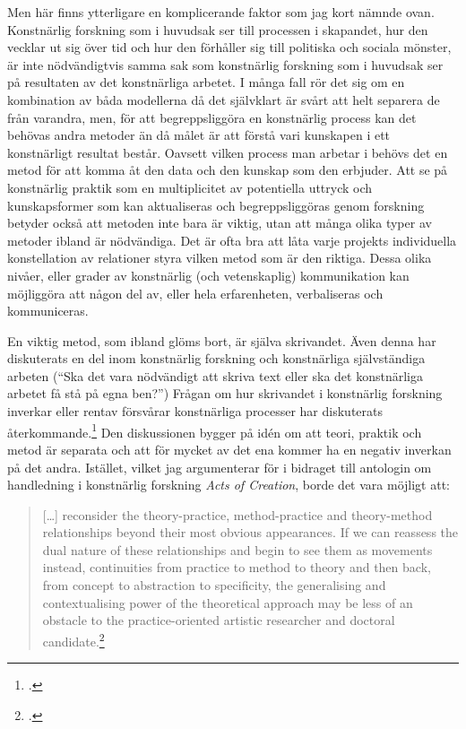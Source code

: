 \documentclass[11pt]{article}
\begin{document}

Men här finns ytterligare en komplicerande faktor som jag kort
nämnde ovan. Konstnärlig forskning som i huvudsak ser till
processen i skapandet, hur den vecklar ut sig över tid och hur den
förhåller sig till politiska och sociala mönster, är inte
nödvändigtvis samma sak som konstnärlig forskning som i huvudsak ser
på resultaten av det konstnärliga arbetet. I många fall rör det sig om
en kombination av båda modellerna då det självklart är svårt att helt
separera de från varandra, men, för att begreppsliggöra en konstnärlig
process kan det behövas andra metoder än då målet är att förstå vari
kunskapen i ett konstnärligt resultat består. Oavsett vilken process
man arbetar i behövs det en metod för att komma åt den data och den
kunskap som den erbjuder. Att se på konstnärlig praktik som en
multiplicitet av potentiella uttryck och kunskapsformer som kan
aktualiseras och begreppsliggöras genom forskning betyder också att
metoden inte bara är viktig, utan att många olika typer av metoder
ibland är nödvändiga. Det är ofta bra att låta varje projekts
individuella konstellation av relationer styra vilken metod som är den
riktiga. Dessa olika nivåer, eller grader av konstnärlig (och
vetenskaplig) kommunikation kan möjliggöra att någon del av, eller
hela erfarenheten, verbaliseras och kommuniceras.

En viktig metod, som ibland glöms bort, är själva skrivandet. Även
denna har diskuterats en del inom konstnärlig forskning och
konstnärliga självständiga arbeten (``Ska det vara nödvändigt att
skriva text eller ska det konstnärliga arbetet få stå på egna ben?'')
Frågan om hur skrivandet i konstnärlig forskning inverkar eller rentav
försvårar konstnärliga processer har diskuterats
återkommande.\footcite[Se till exempel Dieter Lesages översikt som
diskuterar detta:][]{Lesage2009} Den diskussionen bygger på idén om
att teori, praktik och metod är separata och att för mycket av det ena
kommer ha en negativ inverkan på det andra. Istället, vilket jag
argumenterar för i bidraget till antologin om handledning i
konstnärlig forskning \emph{Acts of Creation}, borde det vara möjligt
att:

\begin{quote} [\ldots{}]
    reconsider the theory-practice, method-practice and theory-method
    relationships beyond their most obvious appearances. If we can
    reassess the dual nature of these relationships and begin to see
    them as movements instead, continuities from practice to method to
    theory and then back, from concept to abstraction to specificity,
    the generalising and contextualising power of the theoretical
    approach may be less of an obstacle to the practice-oriented
    artistic researcher and doctoral
    candidate.\footcite[sid. 120]{frisk2015}
\end{quote}
\end{document}
